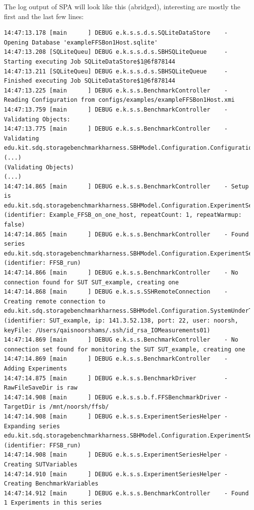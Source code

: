 The log output of SPA will look like this (abridged), interesting are mostly the first and the last few lines:
\begin{lstlisting}
14:47:13.178 [main      ] DEBUG e.k.s.s.d.s.SQLiteDataStore    - Opening Database 'exampleFFSBon1Host.sqlite'
14:47:13.208 [SQLiteQueu] DEBUG e.k.s.s.d.s.SBHSQLiteQueue     - Starting executing Job SQLiteDataStore$1@6f878144
14:47:13.211 [SQLiteQueu] DEBUG e.k.s.s.d.s.SBHSQLiteQueue     - Finished executing Job SQLiteDataStore$1@6f878144
14:47:13.225 [main      ] DEBUG e.k.s.s.BenchmarkController    - Reading Configuration from configs/examples/exampleFFSBon1Host.xmi
14:47:13.759 [main      ] DEBUG e.k.s.s.BenchmarkController    - Validating Objects:
14:47:13.775 [main      ] DEBUG e.k.s.s.BenchmarkController    - Validating edu.kit.sdq.storagebenchmarkharness.SBHModel.Configuration.Configuration@508aeb74
(...)
(Validating Objects)
(...)
14:47:14.865 [main      ] DEBUG e.k.s.s.BenchmarkController    - Setup is edu.kit.sdq.storagebenchmarkharness.SBHModel.Configuration.ExperimentSetup@6e82254d (identifier: Example_FFSB_on_one_host, repeatCount: 1, repeatWarmup: false)
14:47:14.865 [main      ] DEBUG e.k.s.s.BenchmarkController    - Found series edu.kit.sdq.storagebenchmarkharness.SBHModel.Configuration.ExperimentSeries@225f1ae9 (identifier: FFSB_run)
14:47:14.866 [main      ] DEBUG e.k.s.s.BenchmarkController    - No connection found for SUT SUT_example, creating one
14:47:14.868 [main      ] DEBUG e.k.s.s.SSHRemoteConnection    - Creating remote connection to edu.kit.sdq.storagebenchmarkharness.SBHModel.Configuration.SystemUnderTest@3f3a0212 (identifier: SUT_example, ip: 141.3.52.138, port: 22, user: noorsh, keyFile: /Users/qaisnoorshams/.ssh/id_rsa_IOMeasurements01)
14:47:14.869 [main      ] DEBUG e.k.s.s.BenchmarkController    - No connection set found for monitoring the SUT SUT_example, creating one
14:47:14.869 [main      ] DEBUG e.k.s.s.BenchmarkController    - Adding Experiments
14:47:14.875 [main      ] DEBUG e.k.s.s.BenchmarkDriver        - RawFileSaveDir is raw
14:47:14.908 [main      ] DEBUG e.k.s.s.b.f.FFSBenchmarkDriver - TargetDir is /mnt/noorsh/ffsb/
14:47:14.908 [main      ] DEBUG e.k.s.s.ExperimentSeriesHelper - Expanding series edu.kit.sdq.storagebenchmarkharness.SBHModel.Configuration.ExperimentSeries@225f1ae9 (identifier: FFSB_run)
14:47:14.908 [main      ] DEBUG e.k.s.s.ExperimentSeriesHelper - Creating SUTVariables
14:47:14.910 [main      ] DEBUG e.k.s.s.ExperimentSeriesHelper - Creating BenchmarkVariables
14:47:14.912 [main      ] DEBUG e.k.s.s.BenchmarkController    - Found 1 Experiments in this series

\end{lstlisting}
